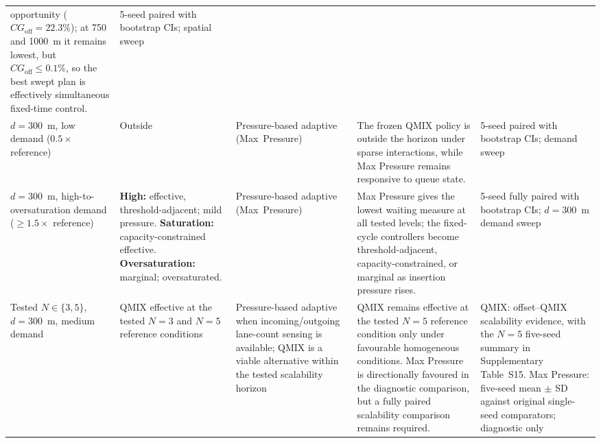 \documentclass[review,12pt]{elsarticle}
\begin{document}
\begin{table}
\begin{adjustbox}{max width=\linewidth,max totalheight=0.82\textwidth}
\begin{tabular}{p{3.0cm}p{2.6cm}p{3.8cm}p{5.0cm}p{3.6cm}}
  opportunity ($CG_{\mathrm{off}}=22.3\%$); at 750 and 1000~m it remains
  lowest, but $CG_{\mathrm{off}}\leq0.1\%$, so the best swept plan is
  effectively simultaneous fixed-time control. &
  5-seed paired with bootstrap CIs; spatial sweep \\
$d=300$~m, low demand ($0.5\times$ reference) &
  Outside &
  Pressure-based adaptive (Max~Pressure) &
  The frozen QMIX policy is outside the horizon under sparse
  interactions, while Max Pressure remains responsive to queue state. &
  5-seed paired with bootstrap CIs; demand sweep \\
$d=300$~m, high-to-oversaturation demand
($\geq1.5\times$ reference) &
  \textbf{High:} effective, threshold-adjacent; mild pressure.\newline
  \textbf{Saturation:} capacity-constrained effective.\newline
  \textbf{Over\-saturation:} marginal; oversaturated. &
  Pressure-based adaptive (Max~Pressure) &
  Max Pressure gives the lowest waiting measure at all tested levels;
  the fixed-cycle controllers become threshold-adjacent,
  capacity-constrained, or marginal as insertion pressure rises. &
  5-seed fully paired with bootstrap CIs; $d=300$~m demand sweep \\
Tested $N\in\{3,5\}$, $d=300$~m, medium demand &
  QMIX effective at the tested $N=3$ and $N=5$ reference conditions &
  Pressure-based adaptive when incoming/outgoing lane-count sensing is
  available; QMIX is a viable alternative within the tested scalability
  horizon &
  QMIX remains effective at the tested $N=5$ reference condition only
  under favourable homogeneous conditions. Max Pressure is directionally
  favoured in the diagnostic comparison, but a fully paired scalability
  comparison remains required. &
  QMIX: offset--QMIX scalability evidence, with the $N=5$ five-seed
  summary in Supplementary Table~S15. Max Pressure: five-seed mean
  $\pm$ SD against original single-seed comparators; diagnostic only \\
\bottomrule
\end{tabular}
\end{adjustbox}
\endgroup
\end{table}
\end{document}
